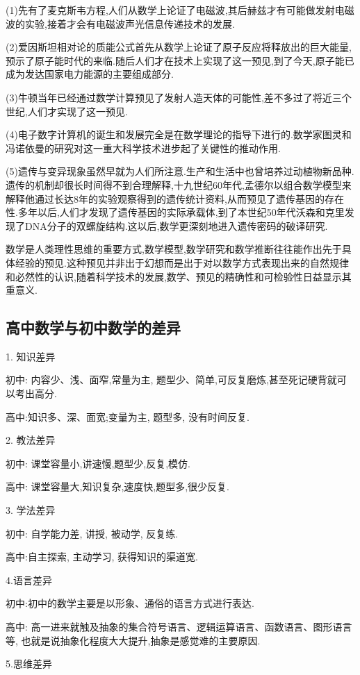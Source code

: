 (1)先有了麦克斯韦方程,人们从数学上论证了电磁波,其后赫兹才有可能做发射电磁波的实验,接着才会有电磁波声光信息传递技术的发展.

(2)爱因斯坦相对论的质能公式首先从数学上论证了原子反应将释放出的巨大能量,预示了原子能时代的来临.随后人们才在技术上实现了这一预见,到了今天,原子能已成为发达国家电力能源的主要组成部分.

(3)牛顿当年已经通过数学计算预见了发射人造天体的可能性,差不多过了将近三个世纪,人们才实现了这一预见.

(4)电子数字计算机的诞生和发展完全是在数学理论的指导下进行的.数学家图灵和冯诺依曼的研究对这一重大科学技术进步起了关键性的推动作用.

(5)遗传与变异现象虽然早就为人们所注意.生产和生活中也曾培养过动植物新品种.遗传的机制却很长时间得不到合理解释,十九世纪60年代,孟德尔以组合数学模型来解释他通过长达8年的实验观察得到的遗传统计资料,从而预见了遗传基因的存在性.多年以后,人们才发现了遗传基因的实际承载体,到了本世纪50年代沃森和克里发现了DNA分子的双螺旋结构.这以后,数学更深刻地进入遗传密码的破译研究.

数学是人类理性思维的重要方式,数学模型,数学研究和数学推断往往能作出先于具体经验的预见.这种预见并非出于幻想而是出于对以数学方式表现出来的自然规律和必然性的认识,随着科学技术的发展,数学、预见的精确性和可检验性日益显示其重意义.

\subsection{高中数学与初中数学的差异}
1. 知识差异

初中: 内容少、浅、面窄,常量为主, 题型少、简单,可反复磨炼,甚至死记硬背就可以考出高分.

高中:知识多、深、面宽;变量为主, 题型多, 没有时间反复.

2. 教法差异

初中: 课堂容量小,讲速慢,题型少,反复,模仿.

高中: 课堂容量大,知识复杂,速度快,题型多,很少反复.

3. 学法差异

初中: 自学能力差, 讲授, 被动学, 反复练.

高中:自主探索, 主动学习, 获得知识的渠道宽.

4.语言差异

初中:初中的数学主要是以形象、通俗的语言方式进行表达.

高中: 高一进来就触及抽象的集合符号语言、逻辑运算语言、函数语言、图形语言等, 也就是说抽象化程度大大提升,抽象是感觉难的主要原因.

5.思维差异

